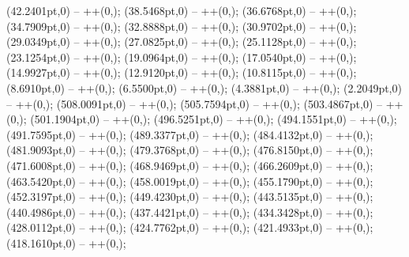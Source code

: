 {   (42.2401pt,0) -- ++(0,\centesimos);
   (38.5468pt,0) -- ++(0,\centesimos);
   (36.6768pt,0) -- ++(0,\centesimos);
   (34.7909pt,0) -- ++(0,\centesimos);
   (32.8888pt,0) -- ++(0,\centesimos);
   (30.9702pt,0) -- ++(0,\centesimos);
   (29.0349pt,0) -- ++(0,\centesimos);
   (27.0825pt,0) -- ++(0,\centesimos);
   (25.1128pt,0) -- ++(0,\centesimos);
   (23.1254pt,0) -- ++(0,\centesimos);
   (19.0964pt,0) -- ++(0,\centesimos);
   (17.0540pt,0) -- ++(0,\centesimos);
   (14.9927pt,0) -- ++(0,\centesimos);
   (12.9120pt,0) -- ++(0,\centesimos);
   (10.8115pt,0) -- ++(0,\centesimos);
   (8.6910pt,0) -- ++(0,\centesimos);
   (6.5500pt,0) -- ++(0,\centesimos);
   (4.3881pt,0) -- ++(0,\centesimos);
   (2.2049pt,0) -- ++(0,\centesimos);
   (508.0091pt,0) -- ++(0,\decimos);
   (505.7594pt,0) -- ++(0,\decimos);
   (503.4867pt,0) -- ++(0,\decimos);
   (501.1904pt,0) -- ++(0,\decimos);
   (496.5251pt,0) -- ++(0,\decimos);
   (494.1551pt,0) -- ++(0,\decimos);
   (491.7595pt,0) -- ++(0,\decimos);
   (489.3377pt,0) -- ++(0,\decimos);
   (484.4132pt,0) -- ++(0,\decimos);
   (481.9093pt,0) -- ++(0,\decimos);
   (479.3768pt,0) -- ++(0,\decimos);
   (476.8150pt,0) -- ++(0,\decimos);
   (471.6008pt,0) -- ++(0,\decimos);
   (468.9469pt,0) -- ++(0,\decimos);
   (466.2609pt,0) -- ++(0,\decimos);
   (463.5420pt,0) -- ++(0,\decimos);
   (458.0019pt,0) -- ++(0,\decimos);
   (455.1790pt,0) -- ++(0,\decimos);
   (452.3197pt,0) -- ++(0,\decimos);
   (449.4230pt,0) -- ++(0,\decimos);
   (443.5135pt,0) -- ++(0,\decimos);
   (440.4986pt,0) -- ++(0,\decimos);
   (437.4421pt,0) -- ++(0,\decimos);
   (434.3428pt,0) -- ++(0,\decimos);
   (428.0112pt,0) -- ++(0,\decimos);
   (424.7762pt,0) -- ++(0,\decimos);
   (421.4933pt,0) -- ++(0,\decimos);
   (418.1610pt,0) -- ++(0,\decimos);
}

